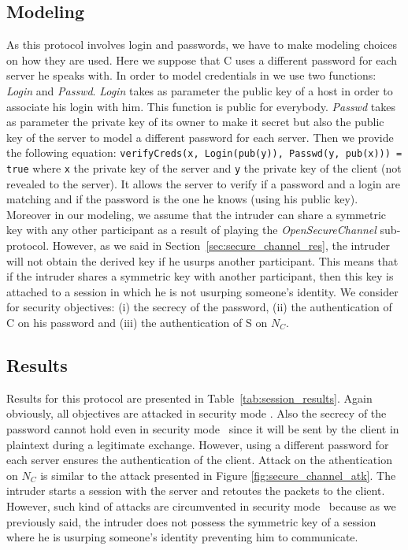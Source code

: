 \subsection{Modeling}

As this protocol involves login and passwords, we have to make
modeling choices on how they are used.  Here we suppose that C uses a
different password for each server he speaks with.  In order to model
credentials in \proverif we use two functions: {\em Login} and {\em
  Passwd}.  {\em Login} takes as parameter the public key of a host in
order to associate his login with him. This function is public for
everybody.  {\em Passwd} takes as parameter the private key of its
owner to make it secret but also the public key of the server to model
a different password for each server.  Then we provide the following
equation: \texttt{verifyCreds(x, Login(pub(y)), Passwd(y, pub(x))) =
  true} where \texttt{x} the private key of the server and \texttt{y}
the private key of the client (not revealed to the server).  It allows
the server to verify if a password and a login are matching and if the
password is the one he knows (using his public key).  Moreover in our
modeling, we assume that the intruder can share a symmetric key with
any other participant as a result of playing the {\em
  OpenSecureChannel} sub-protocol.  However, as we said in
Section~\ref{sec:secure_channel_res}, the intruder will not obtain the
derived key if he usurps another participant.  This means that if the
intruder shares a symmetric key with another participant, then this
key is attached to a session in which he is not usurping someone's
identity.  We consider for security objectives: (i) the secrecy of the
password, (ii) the authentication of C on his password and (iii) the
authentication of S on $N_{C}$.

\subsection{Results}

Results for this protocol are presented in Table~\ref{tab:session_results}.
Again obviously, all objectives are attacked in security mode \smn.
Also the secrecy of the password cannot hold even in security mode \sms~since
it will be sent by the client in plaintext during a legitimate exchange.
However, using a different password for each server ensures the authentication
of the client.
Attack on the athentication on $N_{C}$ is similar to the attack presented in
Figure \ref{fig:secure_channel_atk}.
The intruder starts a session with the server and retoutes the packets to the
client.
However, such kind of attacks are circumvented in security mode \smse~because
as we previously said, the intruder does not possess the symmetric key of a
session where he is usurping someone's identity preventing him to communicate.


